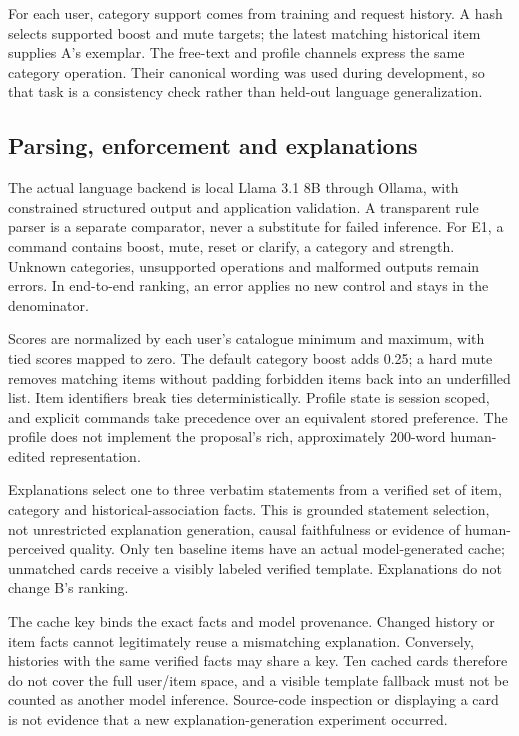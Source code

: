\documentclass[conference]{IEEEtran}
\begin{document}
For each user, category support comes from training and request history. A hash selects supported boost and mute targets; the latest matching historical item supplies A's exemplar. The free-text and profile channels express the same category operation. Their canonical wording was used during development, so that task is a consistency check rather than held-out language generalization.

\subsection{Parsing, enforcement and explanations}
The actual language backend is local Llama 3.1 8B through Ollama, with constrained structured output and application validation. A transparent rule parser is a separate comparator, never a substitute for failed inference. For E1, a command contains boost, mute, reset or clarify, a category and strength. Unknown categories, unsupported operations and malformed outputs remain errors. In end-to-end ranking, an error applies no new control and stays in the denominator.

Scores are normalized by each user's catalogue minimum and maximum, with tied scores mapped to zero. The default category boost adds 0.25; a hard mute removes matching items without padding forbidden items back into an underfilled list. Item identifiers break ties deterministically. Profile state is session scoped, and explicit commands take precedence over an equivalent stored preference. The profile does not implement the proposal's rich, approximately 200-word human-edited representation.

Explanations select one to three verbatim statements from a verified set of item, category and historical-association facts. This is grounded statement selection, not unrestricted explanation generation, causal faithfulness or evidence of human-perceived quality. Only ten baseline items have an actual model-generated cache; unmatched cards receive a visibly labeled verified template. Explanations do not change B's ranking.

The cache key binds the exact facts and model provenance. Changed history or item facts cannot legitimately reuse a mismatching explanation. Conversely, histories with the same verified facts may share a key. Ten cached cards therefore do not cover the full user/item space, and a visible template fallback must not be counted as another model inference. Source-code inspection or displaying a card is not evidence that a new explanation-generation experiment occurred.
\end{document}
